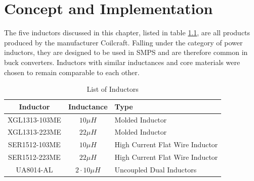 \chapter{Concept and Implementation} \label{sec:cha3}

The five inductors discussed in this chapter, listed in table \ref{tab:list_of_inductors}, are all products produced by the manufacturer Coilcraft. Falling under the category of power inductors, they are designed to be used in \ac{SMPS} and are therefore common in buck converters. Inductors with similar inductances and core materials were chosen to remain comparable to each other.
\begin{table}[H]
    \centering
    \caption{List of Inductors}
    \begin{tabular}{|c|c|l|}
    \hline
    Inductor &  Inductance & Type \\
    \hline
     XGL1313-103ME & $10 \mu H$ & Molded Inductor \\
        XGL1313-223ME & $22 \mu H$ & Molded Inductor \\
        SER1512-103ME & $10 \mu H$ & High Current Flat Wire Inductor \\
        SER1512-223ME & $22 \mu H$ & High Current Flat Wire Inductor \\
        UA8014-AL & $2 \cdot 10 \mu H$ & Uncoupled Dual Inductors \\
    \hline
    \end{tabular}
    \label{tab:list_of_inductors}
\end{table}

